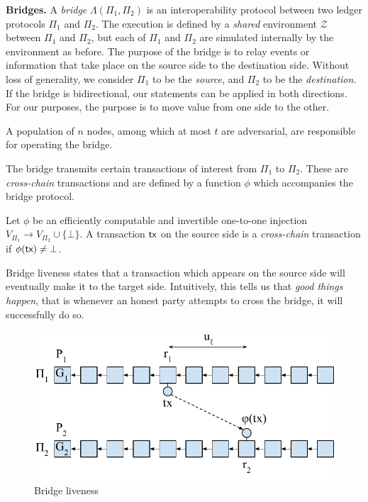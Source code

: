 \noindent
\textbf{Bridges.}
A \emph{bridge} $\Lambda(\Pi_1, \Pi_2)$ is an interoperability protocol between two ledger protocols
$\Pi_1$ and $\Pi_2$. The execution is defined by a \emph{shared} environment $\mathcal{Z}$ between $\Pi_1$
and $\Pi_2$, but each of $\Pi_1$ and $\Pi_2$ are simulated internally by the environment as before.
The purpose of the bridge is to relay events or information that take place on the source
side to the destination side. Without loss of generality, we consider $\Pi_1$ to be the \emph{source},
and $\Pi_2$ to be the \emph{destination}. If the bridge is bidirectional, our statements can be
applied in both directions. For our purposes, the purpose is to move value from one side to
the other.

A population of $n$ nodes, among which at most $t$ are adversarial, are responsible for operating the
bridge.

The bridge transmits certain transactions of interest from $\Pi_1$ to $\Pi_2$. These are \emph{cross-chain}
transactions and are defined by a function $\phi$ which accompanies the bridge protocol.

\begin{definition}
  Let $\phi$ be an efficiently computable and invertible one-to-one
  injection $V_{\Pi_1} \longrightarrow V_{\Pi_2} \cup \{ \bot \}$.
  A transaction $\textsf{tx}$ on the source side is a \emph{cross-chain} transaction if
  $\phi(\textsf{tx}) \neq \bot$.
\end{definition}

Bridge liveness states that a transaction which appears on the source side will eventually make
it to the target side. Intuitively, this tells us that \emph{good things happen}, that is whenever an
honest party attempts to cross the bridge, it will successfully do so.

\begin{figure}
    \center
    \includegraphics[width=0.7\columnwidth]{figures/bridge-liveness.pdf}
    \caption{Bridge liveness}
    \label{fig:bridge-liveness}
\end{figure}

